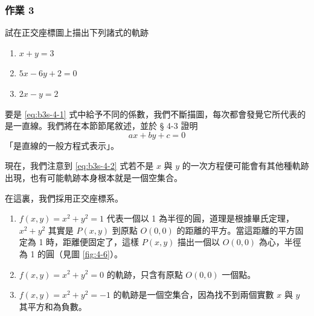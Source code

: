 \subsubsection*{作業 3}
試在正交座標圖上描出下列諸式的軌跡
\begin{enumerate}[label=(\roman*), leftmargin=2em]
  \item $x + y = 3$
  \item $5x - 6y + 2 = 0$
  \item $2x - y = 2$
\end{enumerate}

要是 \eqref{eq:b3s-4-1} 式中給予不同的係數，我們不斷描圖，每次都會發覺它所代表的是一直線。我們將在本節節尾敘述，並於 § 4-3 證明
\begin{equation}
ax + by + c = 0
\label{eq:b3s-4-2}
\end{equation}
「是直線的一般方程式表示」。

現在，我們注意到 \eqref{eq:b3s-4-2} 式若不是 $x$ 與 $y$ 的一次方程便可能會有其他種軌跡出現，也有可能軌跡本身根本就是一個空集合。

\begin{example}[論例 1]
在這裏，我們採用正交座標系。
\begin{enumerate}[label=(\roman*), leftmargin=2em]
  \item $f(x, y) = x^2 + y^2 = 1$ 代表一個以 1 為半徑的圓，道理是根據畢氏定理，$x^2 + y^2$ 其實是 $P(x, y)$ 到原點 $O(0, 0)$ 的距離的平方。當這距離的平方固定為 1 時，距離便固定了，這樣 $P(x, y)$ 描出一個以 $O(0, 0)$ 為心，半徑為 1 的圓（見圖 \ref{fig:4-6}）。
  \item $f(x, y) = x^2 + y^2 = 0$ 的軌跡，只含有原點 $O(0, 0)$ 一個點。
  \item $f(x, y) = x^2 + y^2 = -1$ 的軌跡是一個空集合，因為找不到兩個實數 $x$ 與 $y$ 其平方和為負數。
\end{enumerate}
\end{example}


